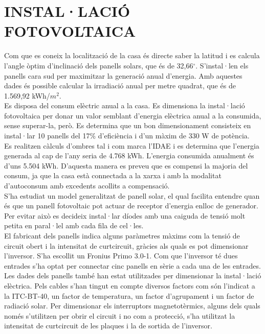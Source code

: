 \chapter{\uppercase{Instal·lació fotovoltaica}}


Com que es coneix la localització de la casa és directe saber la latitud i es calcula l'angle òptim d'inclinació dels panells solars, que és de 32,66$^{\circ}$. S'instal·len els panells cara sud per maximitzar la generació anual d'energia. Amb aquestes dades és possible calcular la irradiació anual per metre quadrat, que és de 1.569,92 kWh/$m^2$. \\
\newline Es disposa del consum elèctric anual a la casa. Es dimensiona la instal·lació fotovoltaica per donar un valor semblant d'energia elèctrica anual a la consumida, sense superar-la, però. Es determina que un bon dimensionament consisteix en instal·lar 10 panells del 17\% d'eficiència i d'un màxim de 330 W de potència.\\
\newline Es realitzen càlculs d'ombres tal i com marca l'IDAE i es determina que l'energia generada al cap de l'any seria de 4.768 kWh. L'energia consumida anualment és d'uns 5.504 kWh. D'aquesta manera es preveu que es compensi la majoria del consum, ja que la casa està connectada a la xarxa i amb la modalitat d'autoconsum amb excedents acollits a compensació.\\
\newline S'ha estudiat un model generalitzat de panell solar, el qual facilita entendre quan és que un panell fotovoltaic pot actuar de receptor d'energia enlloc de generador. Per evitar això es decideix instal·lar díodes amb una caiguda de tensió molt petita en paral·lel amb cada fila de cel·les.\\
\newline El fabricant dels panells indica alguns paràmetres màxims com la tensió de circuit obert i la intensitat de curtcircuit, gràcies als quals es pot dimensionar l'inversor. S'ha escollit un Fronius Primo 3.0-1. Com que l'inversor té dues entrades s'ha optat per connectar cinc panells en sèrie a cada una de les entrades.\\
\newline Les dades dels panells també han estat utilitzades per dimensionar la instal·lació elèctrica. Pels cables s'han tingut en compte diversos factors com són l'indicat a la ITC-BT-40, un factor de temperatura, un factor d'agrupament i un factor de radiació solar. Per dimensionar els interruptors magnetotèrmics, alguns dels quals només s'utilitzen per obrir el circuit i no com a protecció, s'ha utilitzat la intensitat de curtcircuit de les plaques i la de sortida de l'inversor.




\clearpage



